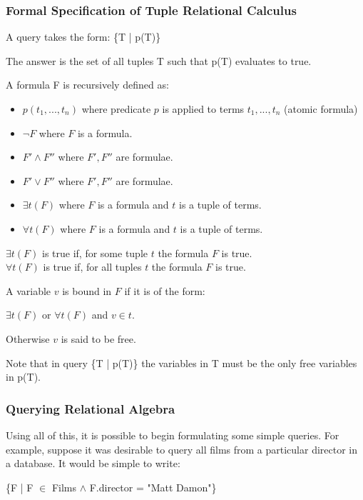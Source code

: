 \documentclass[a4paper, 11pt]{article}
\begin{document}
  \subsubsection{Formal Specification of Tuple Relational Calculus\cite{lecRA}}
    \label{sec:formalTRC}
    A query takes the form: \{T | p(T)\}

    The answer is the set of all tuples T such that p(T) evaluates to true.

    A formula F is recursively defined as:
    \begin{itemize}
      \item $p(t_1, ..., t_n)$ where predicate $p$ is applied to terms $t_1, ..., t_n$ (atomic formula)
        \item $\lnot F$ where $F$ is a formula.
        \item $F' \land F''$ where $F', F''$ are formulae.
        \item $F' \lor F''$ where $F', F''$ are formulae.
        \item $\exists t(F)$ where $F$ is a formula and $t$ is a tuple of terms.
        \item $\forall t(F)$ where $F$ is a formula and $t$ is a tuple of terms.
      \end{itemize}

      $\exists t(F)$ is true if, for some tuple $t$ the formula $F$ is true. \\
      $\forall t(F)$ is true if, for all tuples $t$ the formula $F$ is true.

      A variable $v$ is bound in $F$ if it is of the form:

      $\exists t(F)$ or $\forall t(F)$ and $v \in t$.

      Otherwise $v$ is said to be free.
      
      Note that in query \{T | p(T)\} the variables in T must be the only
      free variables in p(T).

    \subsubsection{Querying Relational Algebra}
      Using all of this, it is possible to begin formulating some simple
      queries. For example, suppose it was desirable to query all films from a
      particular director in a database. It would be simple to write:

      \begin{center}
        \{F | F $\in$ Films $\land$ F.director = "Matt Damon"\}
      \end{center}
\end{document}
